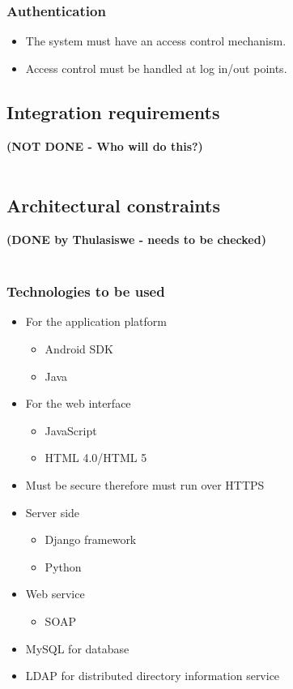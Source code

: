 \documentclass[11pt,a4paper]{article}
\begin{document}
	\subsubsection{Authentication}
	\begin{itemize}
	\item The system must have an access control mechanism.
	\item Access control must be handled at log in/out points.
	\end{itemize}
	
	
\subsection{Integration requirements}
\textbf{(NOT DONE - Who will do this?)}\\ \\



\subsection{Architectural constraints}
\textbf{(DONE by Thulasiswe - needs to be checked)}\\ \\
\subsubsection{Technologies to be used}
	\begin{itemize}
	\item For the application platform
	\begin{itemize}
	\item Android SDK
	\item Java
	\end{itemize}
	\item For the web interface
	\begin{itemize}
	\item JavaScript
	\item HTML 4.0/HTML 5
	\end{itemize}
	\item Must be secure therefore must run over HTTPS
	\item Server side
	\begin{itemize}
	\item Django framework
	\item Python
	\end{itemize}
	\item Web service
	\begin{itemize}
	\item SOAP
	\end{itemize}
	\item MySQL for database
	\item LDAP for distributed directory information service
	\end{itemize}
	
\end{document}
